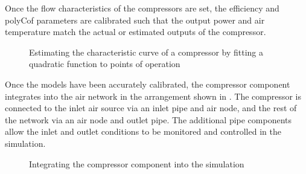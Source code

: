 		 Once the flow characteristics of the compressors are set, the efficiency and \gls{polyCof} parameters are calibrated such that the output power and air temperature match the actual or estimated outputs of the compressor.
		\par 
		\begin{figure}[h!]
			\centering
			\fbox{}
			\caption{Estimating the characteristic curve of a compressor by fitting a quadratic function to points of operation}
			\label{fig: Compressor Curve}
		\end{figure}
	\clearpage
		Once the models have been accurately calibrated, the compressor component integrates into the air network in the arrangement shown in . The compressor is connected to the inlet air source via an inlet pipe and air node, and the rest of the network via an air node and outlet pipe. The additional pipe components allow the inlet and outlet conditions to be monitored and controlled in the simulation.
		\begin{figure}[h]
			\centering
			\caption{Integrating the compressor component into the simulation}
			\label{fig: Compressor models}
		\end{figure}		

